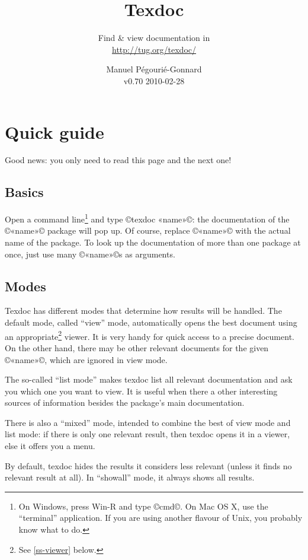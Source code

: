 \documentclass[a4paper, oneside]{scrartcl}
\title{Texdoc}
\subtitle{Find \& view documentation in \texlive\\
  \href{http://tug.org/texdoc/}{http://tug.org/texdoc/}\\
  \mailto{texdoc@tug.org}}
\author{Manuel Pégourié-Gonnard\\
  v0.70 2010-02-28}
\date{}
\begin{document}
\VerbatimFootnotes

\maketitle

\section{Quick guide}

\textcolor{quick}{
  Good news: you only need to read this page and the next one!}

\subsection{Basics}

Open a command line\footnote{On Windows, press Win-R and type ©cmd©.  On Mac
  OS X, use the ``terminal'' application.  If you are using another flavour of
  Unix, you probably know what to do.} and type ©texdoc «name»©: the
documentation of the ©«name»© package will pop up. Of course, replace ©«name»©
with the actual name of the package.  To look up the documentation of more
than one package at once, just use many ©«name»©s as arguments.

\subsection{Modes}\label{ss-modes}

Texdoc has different modes that determine how results will be handled. The
default mode, called ``view'' mode, automatically opens the best document
using an appropriate\footnote{See \ref{ss-viewer} below.} viewer. It is very
handy for quick access to a precise document.  On the other hand, there may be
other relevant documents for the given ©«name»©, which are ignored in view
mode.

The so-called ``list mode'' makes texdoc list all relevant documentation and
ask you which one you want to view. It is useful when there a other
interesting sources of information besides the package's main documentation.

There is also a ``mixed'' mode, intended to combine the best of view mode and
list mode: if there is only one relevant result, then texdoc opens it in a
viewer, else it offers you a menu.

By default, texdoc hides the results it considers less relevant (unless it
finds no relevant result at all). In ``showall'' mode, it always shows all
results.
\end{document}
